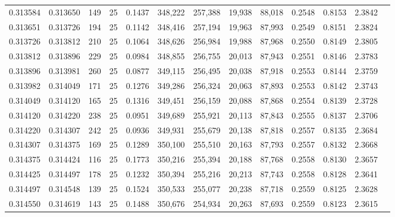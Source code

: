 \begin{tabular}{rrrrrrrrrrrrr}
0.313584 & 0.313650 &   149 &  25 &                                     0.1437 & 348,222 & 257,388 &  19,938 &  88,018 & 0.2548 & 0.8153 & 2.3842 \\
0.313651 & 0.313726 &   194 &  25 &                                     0.1142 & 348,416 & 257,194 &  19,963 &  87,993 & 0.2549 & 0.8151 & 2.3824 \\
0.313726 & 0.313812 &   210 &  25 &                                     0.1064 & 348,626 & 256,984 &  19,988 &  87,968 & 0.2550 & 0.8149 & 2.3805 \\
0.313812 & 0.313896 &   229 &  25 &                                     0.0984 & 348,855 & 256,755 &  20,013 &  87,943 & 0.2551 & 0.8146 & 2.3783 \\
0.313896 & 0.313981 &   260 &  25 &                                     0.0877 & 349,115 & 256,495 &  20,038 &  87,918 & 0.2553 & 0.8144 & 2.3759 \\
0.313982 & 0.314049 &   171 &  25 &                                     0.1276 & 349,286 & 256,324 &  20,063 &  87,893 & 0.2553 & 0.8142 & 2.3743 \\
0.314049 & 0.314120 &   165 &  25 &                                     0.1316 & 349,451 & 256,159 &  20,088 &  87,868 & 0.2554 & 0.8139 & 2.3728 \\
0.314120 & 0.314220 &   238 &  25 &                                     0.0951 & 349,689 & 255,921 &  20,113 &  87,843 & 0.2555 & 0.8137 & 2.3706 \\
0.314220 & 0.314307 &   242 &  25 &                                     0.0936 & 349,931 & 255,679 &  20,138 &  87,818 & 0.2557 & 0.8135 & 2.3684 \\
0.314307 & 0.314375 &   169 &  25 &                                     0.1289 & 350,100 & 255,510 &  20,163 &  87,793 & 0.2557 & 0.8132 & 2.3668 \\
0.314375 & 0.314424 &   116 &  25 &                                     0.1773 & 350,216 & 255,394 &  20,188 &  87,768 & 0.2558 & 0.8130 & 2.3657 \\
0.314425 & 0.314497 &   178 &  25 &                                     0.1232 & 350,394 & 255,216 &  20,213 &  87,743 & 0.2558 & 0.8128 & 2.3641 \\
0.314497 & 0.314548 &   139 &  25 &                                     0.1524 & 350,533 & 255,077 &  20,238 &  87,718 & 0.2559 & 0.8125 & 2.3628 \\
0.314550 & 0.314619 &   143 &  25 &                                     0.1488 & 350,676 & 254,934 &  20,263 &  87,693 & 0.2559 & 0.8123 & 2.3615 \\

\end{tabular}
